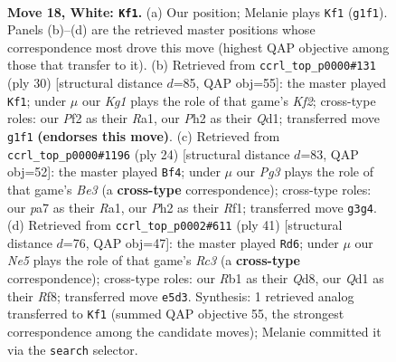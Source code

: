 \documentclass[11pt]{article}
\begin{document}
\clearpage

\begin{figure}[p]\centering
\begin{subfigure}{0.46\textwidth}\centering
\resizebox{\linewidth}{!}{%
\newchessgame
\chessboard[
  setfen={rnb1q1k1/pp2r1pp/8/3pNp1n/8/2B1P1P1/P4PBP/1R1QR1K1 w - - 0 18},
  showmover=false,
  pgfstyle=straightmove, color=movearrow, markmove={g1-f1}
]}
\caption{}
\end{subfigure}\hfill
\begin{subfigure}{0.46\textwidth}\centering
\resizebox{\linewidth}{!}{%
\newchessgame
\chessboard[
  setfen={r2qk2r/bpp2pp1/4p3/p2p4/3n1P2/PP4P1/1BPN1KB1/R2QR3 w kq - 0 16},
  showmover=false,
  pgfstyle=straightmove, color=movearrow, markmove={f2-f1}
]}
\caption{}
\end{subfigure}
\\[4pt]
\begin{subfigure}{0.46\textwidth}\centering
\resizebox{\linewidth}{!}{%
\newchessgame
\chessboard[
  setfen={r1bq1rk1/pp3ppp/2n5/3p4/3N2n1/2PPB1P1/P4PBP/R2Q1RK1 w - - 1 13},
  showmover=false,
  pgfstyle=straightmove, color=movearrow, markmove={e3-f4}
]}
\caption{}
\end{subfigure}\hfill
\begin{subfigure}{0.46\textwidth}\centering
\resizebox{\linewidth}{!}{%
\newchessgame
\chessboard[
  setfen={3q1rk1/4bpp1/p1r1pn1p/P7/3P4/2N2Q2/1P3PPP/R1BR2K1 b - - 1 21},
  showmover=false,
  pgfstyle=straightmove, color=movearrow, markmove={c6-d6}
]}
\caption{}
\end{subfigure}
\caption{\textbf{Move 18, White: \texttt{Kf1}.} (a) Our position; Melanie plays \texttt{Kf1} (\texttt{g1f1}). Panels (b)--(d) are the retrieved master positions whose correspondence most drove this move (highest QAP objective among those that transfer to it). (b) Retrieved from \texttt{ccrl\_top\_p0000\#131} (ply 30) [structural distance $d$=85, QAP obj=55]: the master played \texttt{Kf1}; under $\mu$ our \emph{Kg1} plays the role of that game's \emph{Kf2}; cross-type roles: our \emph{P}f2 as their \emph{R}a1, our \emph{P}h2 as their \emph{Q}d1; transferred move \texttt{g1f1} \textbf{(endorses this move)}. (c) Retrieved from \texttt{ccrl\_top\_p0000\#1196} (ply 24) [structural distance $d$=83, QAP obj=52]: the master played \texttt{Bf4}; under $\mu$ our \emph{Pg3} plays the role of that game's \emph{Be3} (a \textbf{cross-type} correspondence); cross-type roles: our \emph{p}a7 as their \emph{R}a1, our \emph{P}h2 as their \emph{R}f1; transferred move \texttt{g3g4}. (d) Retrieved from \texttt{ccrl\_top\_p0002\#611} (ply 41) [structural distance $d$=76, QAP obj=47]: the master played \texttt{Rd6}; under $\mu$ our \emph{Ne5} plays the role of that game's \emph{Rc3} (a \textbf{cross-type} correspondence); cross-type roles: our \emph{R}b1 as their \emph{Q}d8, our \emph{Q}d1 as their \emph{R}f8; transferred move \texttt{e5d3}. Synthesis: 1 retrieved analog transferred to \texttt{Kf1} (summed QAP objective 55, the strongest correspondence among the candidate moves); Melanie committed it via the \texttt{search} selector.}
\label{fig:thought-m34}
\end{figure}
\end{document}
